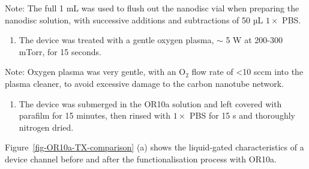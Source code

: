 \documentclass[
  a4paper,
]{scrbook}
\providecommand{\tightlist}{%
  \setlength{\itemsep}{0pt}\setlength{\parskip}{0pt}}\usepackage{longtable,booktabs,array}
\begin{document}
Note: The full 1 mL was used to flush out the nanodisc vial when
preparing the nanodisc solution, with successive additions and
subtractions of 50 µL \(1 \times\) PBS.

\begin{enumerate}
\def\labelenumi{\arabic{enumi}.}
\setcounter{enumi}{3}
\tightlist
\item
  The device was treated with a gentle oxygen plasma, \(\sim\) 5 W at
  200-300 mTorr, for 15 seconds.
\end{enumerate}

Note: Oxygen plasma was very gentle, with an O\(_2\) flow rate of
\textless10 sccm into the plasma cleaner, to avoid excessive damage to
the carbon nanotube network.

\begin{enumerate}
\def\labelenumi{\arabic{enumi}.}
\setcounter{enumi}{4}
\tightlist
\item
  The device was submerged in the OR10a solution and left covered with
  parafilm for 15 minutes, then rinsed with \(1 \times\) PBS for 15 s
  and thoroughly nitrogen dried.
\end{enumerate}

Figure~\ref{fig-OR10a-TX-comparison} (a) shows the liquid-gated
characteristics of a device channel before and after the
functionalisation process with OR10a.
\end{document}
